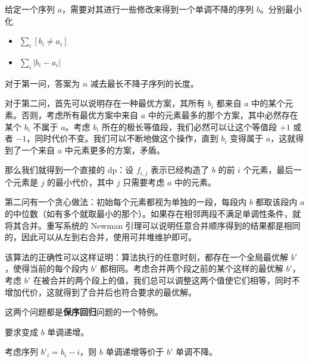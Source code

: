 \begin{example}
    给定一个序列 $a$，需要对其进行一些修改来得到一个单调不降的序列 $b$。分别最小化
    \begin{itemize}
        \item $\sum_i [b_i\ne a_i]$
        \item $\sum_i |b_i-a_i|$
    \end{itemize}
\end{example}
\begin{solution}
    对于第一问，答案为 $n$ 减去最长不降子序列的长度。

    对于第二问，首先可以说明存在一种最优方案，其所有 $b_i$ 都来自 $a$ 中的某个元素。否则，考虑所有最优方案中来自 $a$ 中的元素最多的那个方案，其中必然存在某个 $b_i$ 不属于 $a$。考虑 $b_i$ 所在的极长等值段，我们必然可以让这个等值段 $+1$ 或者 $-1$，同时代价不变。我们可以不断地做这个操作，直到 $b_i$ 变得属于 $a$，这就得到了一个来自 $a$ 中元素更多的方案，矛盾。

    那么我们就得到一个直接的 dp：设 $f_{i,j}$ 表示已经构造了 $b$ 的前 $i$ 个元素，最后一个元素是 $j$ 的最小代价，其中 $j$ 只需要考虑 $a$ 中的元素。
\end{solution}
\begin{solution}[更进一步]
    第二问有一个贪心做法：初始每个元素都视为单独的一段，每段内 $b$ 都取该段内 $a$ 的中位数（如有多个就取最小的那个）。如果存在相邻两段不满足单调性条件，就将其合并。重写系统的 Newman 引理可以说明任意合并顺序得到的结果都是相同的，因此可以从左到右合并，使用可并堆维护即可。
    
    该算法的正确性可以这样证明：算法执行的任意时刻，都存在一个全局最优解 $b'$，使得当前的每个段内 $b'$ 都相同。考虑合并两个段之前的某个这样的最优解 $b'$，考虑 $b'$ 在被合并的两个段上的值，我们总可以调整这两个值使它们相等，同时不增加代价，这就得到了合并后也符合要求的最优解。
\end{solution}
\begin{remark}
    这两个问题都是\textbf{保序回归}问题的一个特例。
\end{remark}
\begin{exercise}
    要求变成 $b$ 单调递增。
    \begin{hint}
        考虑序列 $b'_i=b_i-i$，则 $b$ 单调递增等价于 $b'$ 单调不降。
    \end{hint}
\end{exercise}

\begin{example}
    
\end{example}

